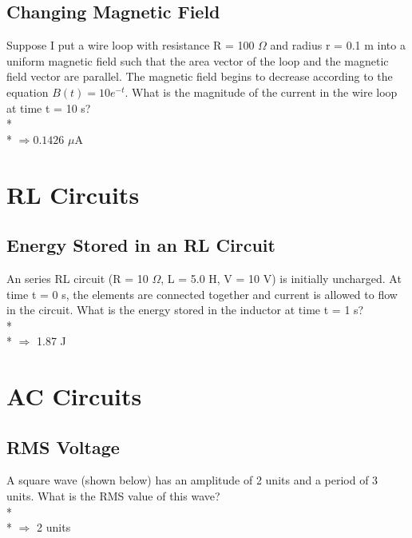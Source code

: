 \documentclass[11pt]{article}
\begin{document}
\subsection{Changing Magnetic Field}
Suppose I put a wire loop with resistance R = 100 $\Omega$ and radius r = 0.1 m into a uniform magnetic field such that the area vector of the loop and the magnetic field vector are parallel.  The magnetic field begins to decrease according to the equation $B(t) = 10e^{-t}$.  What is the magnitude of the current in the wire loop at time t = 10 s? \\* \\*
$\Rightarrow 0.1426$ $\mu$A



\pagebreak
\section{RL Circuits}
\vspace{10pt}

\subsection{Energy Stored in an RL Circuit}
An series RL circuit (R = 10 $\Omega$, L = 5.0 H, V = 10 V) is initially uncharged.  At time t = 0 s, the elements are connected together and current is allowed to flow in the circuit.  What is the energy stored in the inductor at time t = 1 s? \\* \\*
$\Rightarrow$ 1.87 J



\pagebreak
\section{AC Circuits}
\vspace{10pt}

\subsection{RMS Voltage}
A square wave (shown below) has an amplitude of 2 units and a period of 3 units.  What is the RMS value of this wave? \\* \\*
$\Rightarrow$ 2 units
\end{document}
